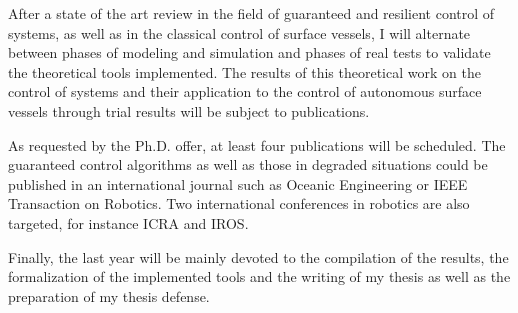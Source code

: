 \documentclass[11pt, a4paper]{awesome-cv}
\begin{document}
\begin{cvletter}

			After a state of the art review in the field of guaranteed and resilient control of systems, as well as in the classical control of surface vessels, I will alternate between phases of modeling and simulation and phases of real tests to validate the theoretical tools implemented. The results of this theoretical work on the control of systems and their application to the control of autonomous surface vessels through trial results will be subject to publications.
			
			As requested by the Ph.D. offer, at least four publications will be scheduled. The guaranteed control algorithms as well as those in degraded situations could be published in an international journal such as Oceanic Engineering or IEEE Transaction on Robotics. Two international conferences in robotics are also targeted, for instance \textsc{ICRA} and \textsc{IROS}.

			Finally, the last year will be mainly devoted to the compilation of the results, the formalization of the implemented tools and the writing of my thesis as well as the preparation of my thesis defense.

\end{cvletter}
\end{document}
